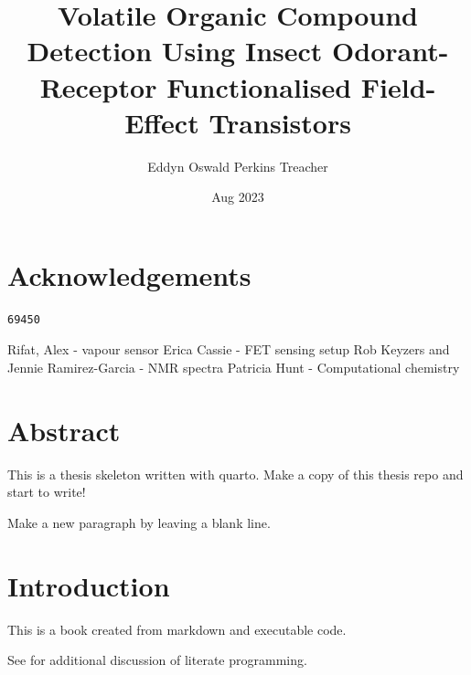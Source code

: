 \documentclass[
  a4paper,
]{scrbook}
\title{Volatile Organic Compound Detection Using Insect Odorant-Receptor
Functionalised Field-Effect Transistors}
\author{Eddyn Oswald Perkins Treacher}
\date{Aug 2023}
\begin{document}
\frontmatter
\maketitle
\ifdefined\Shaded\renewenvironment{Shaded}{\begin{tcolorbox}[boxrule=0pt, frame hidden, interior hidden, borderline west={3pt}{0pt}{shadecolor}, enhanced, sharp corners, breakable]}{\end{tcolorbox}}\fi

\mainmatter
{}

\hypertarget{acknowledgements}{%
\chapter*{Acknowledgements}\label{acknowledgements}}


\begin{verbatim}
69450
\end{verbatim}

Rifat, Alex - vapour sensor Erica Cassie - FET sensing setup Rob Keyzers
and Jennie Ramirez-Garcia - NMR spectra Patricia Hunt - Computational
chemistry


\hypertarget{abstract}{%
\chapter*{Abstract}\label{abstract}}


This is a thesis skeleton written with quarto. Make a copy of this
thesis repo and start to write!

Make a new paragraph by leaving a blank line.

\newpage
\tableofcontents


\hypertarget{introduction}{%
\chapter{Introduction}\label{introduction}}

This is a book created from markdown and executable code.

See for additional discussion of literate programming.
\end{document}
